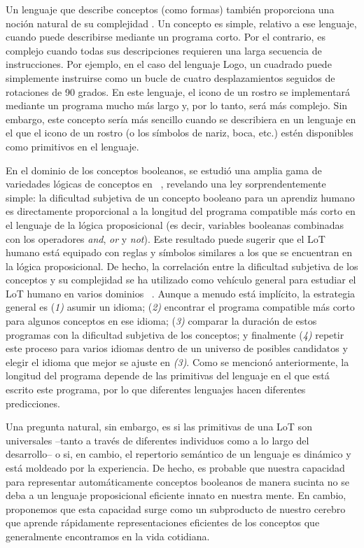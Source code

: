 Un lenguaje que describe conceptos (como formas) también proporciona una noción natural de su complejidad \cite{kolmogorov1968three}. Un concepto es simple, relativo a ese lenguaje, cuando puede describirse mediante un programa corto. Por el contrario, es complejo cuando todas sus descripciones requieren una larga secuencia de instrucciones. Por ejemplo, en el caso del lenguaje Logo, un cuadrado puede simplemente instruirse como un bucle de cuatro desplazamientos seguidos de rotaciones de 90 grados. En este lenguaje, el icono de un rostro se implementará mediante un programa mucho más largo y, por lo tanto, será más complejo. Sin embargo, este concepto sería más sencillo cuando se describiera en un lenguaje en el que el icono de un rostro (o los símbolos de nariz, boca, etc.) estén disponibles como primitivos en el lenguaje.

En el dominio de los conceptos booleanos, se estudió una amplia gama de variedades lógicas de conceptos en ~\cite{feldman2003simplicity}, revelando una ley sorprendentemente simple: la dificultad subjetiva de un concepto booleano para un aprendiz humano es directamente proporcional a la longitud del programa compatible más corto en el lenguaje de la lógica proposicional (es decir, variables booleanas combinadas con los operadores \textit{and}, \textit {or} y \textit{not}). Este resultado puede sugerir que el LoT humano está equipado con reglas y símbolos similares a los que se encuentran en la lógica proposicional. De hecho, la correlación entre la dificultad subjetiva de los conceptos y su complejidad se ha utilizado como vehículo general para estudiar el LoT humano en varios dominios ~\cite{piantadosi2016logical, leeuwenberg1971perceptual, amalric2017language, romano2018, lupyan2007language}. Aunque a menudo está implícito, la estrategia general es (\textit{1)} asumir un idioma; (\textit{2)} encontrar el programa compatible más corto para algunos conceptos en ese idioma; (\textit{3)} comparar la duración de estos programas con la dificultad subjetiva de los conceptos; y finalmente (\textit{4)} repetir este proceso para varios idiomas dentro de un universo de posibles candidatos y elegir el idioma que mejor se ajuste en \textit{(3)}. Como se mencionó anteriormente, la longitud del programa depende de las primitivas del lenguaje en el que está escrito este programa, por lo que diferentes lenguajes hacen diferentes predicciones.

Una pregunta natural, sin embargo, es si las primitivas de una LoT son universales --tanto a través de diferentes individuos como a lo largo del desarrollo-- o si, en cambio, el repertorio semántico de un lenguaje es dinámico y está moldeado por la experiencia. De hecho, es probable que nuestra capacidad para representar automáticamente conceptos booleanos de manera sucinta no se deba a un lenguaje proposicional eficiente innato en nuestra mente. En cambio, proponemos que esta capacidad surge como un subproducto de nuestro cerebro que aprende rápidamente representaciones eficientes de los conceptos que generalmente encontramos en la vida cotidiana. 

